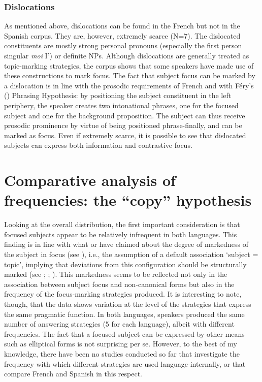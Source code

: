 {\subsubsection{Dislocations}

As mentioned above, dislocations can be found in the French but not in the Spanish corpus. They are, however, extremely scarce (N=7). The  dislocated constituents are mostly strong personal pronouns (especially the first person singular \textit{moi} I') or definite NPs. Although dislocations are generally treated as topic-marking strategies, the corpus shows that some speakers have made use of these constructions to mark focus. The fact that subject focus can be marked by a dislocation is in line with the prosodic requirements of French and with Féry's (\citeyear{fery2001focus}) Phrasing Hypothesis: by positioning the subject constituent in the left periphery, the speaker creates two intonational phrases, one for the focused subject and one for the background proposition. The subject can thus receive prosodic prominence by virtue of being positioned phrase-finally, and can be marked as focus. Even if extremely scarce, it is possible to see that dislocated subjects can express both information and contrastive focus.

\section{Comparative analysis of frequencies: the ``copy” hypothesis} \label{sub:4.7}
Looking at the overall distribution, the first important consideration is that focused subjects appear to be relatively infrequent in both languages. This finding is in line with what \textcite{lambrecht1996information} or \textcite{skopeteas2010focus} have claimed about the degree of markedness of the subject in focus (see ), i.e., the assumption of a default association ‘subject = topic’, implying that deviations from this configuration should be structurally marked (see \cite[490]{lambrecht2001framework}; \cite[336]{zerbian2007investigating}; \cite{hartmann2007place}). This markedness seems to be reflected not only in the association between subject focus and non-canonical forms but also in the frequency of the focus-marking strategies produced. It is interesting to note, though, that the data shows variation at the level of the strategies that express the same pragmatic function. In both languages, speakers produced the same number of answering strategies (5 for each language), albeit with different frequencies. The fact that a focused subject can be expressed by other means such as elliptical forms is not surprising per se. However, to the best of my knowledge, there have been no studies  conducted so far that investigate the frequency with which different strategies are used language-internally, or that compare French and Spanish in this respect.

}
